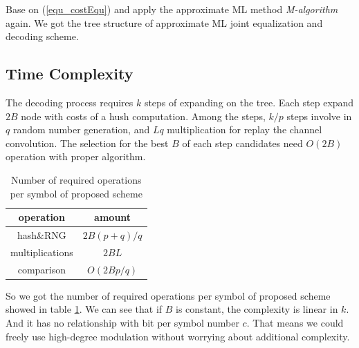 \documentclass[conference]{IEEEtran}
\begin{document}
Base on (\ref{equ_costEqu}) and apply the approximate ML method \textit{M-algorithm} again. We got the tree structure of approximate ML joint equalization and decoding scheme.


\subsection{Time Complexity}
The decoding process requires $k$ steps of expanding on the tree. Each step expand $2B$ node with costs of a hush computation. Among the steps, $k/p$ steps involve in $q$ random number generation, and $Lq$ multiplication for replay the channel convolution. The selection for the best $B$ of each step candidates need $O(2B)$ operation with proper algorithm. 

\begin{table}[!t]
\renewcommand{\arraystretch}{1.3}
\centering
\caption{Number of required operations per symbol of proposed scheme}
\label{tab_ComplexitySpinal}
\begin{tabular}{|c||c|}
\hline
operation &amount \\
\hline
hash\&RNG  & $2B(p+q)/q$\\
\hline
multiplications& $2BL$\\
\hline
comparison & $O(2Bp/q)$\\
\hline

\end{tabular}

\end{table}

So we got the number of required operations per symbol of proposed scheme showed in table \ref{tab_ComplexitySpinal}. We can see that if $B$ is constant, the complexity is linear in $k$. And it has no relationship with bit per symbol number $c$. That means we could freely use high-degree modulation without worrying about additional complexity. 
\end{document}
